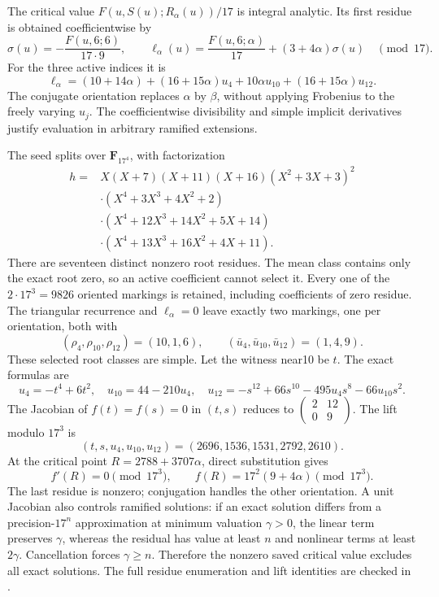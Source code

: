 \documentclass[
  british,
  10pt,
  a4paper,
]{article}
\begin{document}
The critical value \(F(u,S(u);R_\alpha(u))/17\) is integral analytic.
Its first residue is obtained coefficientwise by \[
\sigma(u)=-\frac{F(u,6;6)}{17\cdot9},
\qquad
\ell_\alpha(u)=\frac{F(u,6;\alpha)}{17}+(3+4\alpha)\sigma(u)
\quad\pmod{17}.
\] For the three active indices it is \[
\ell_\alpha=(10+14\alpha)+(16+15\alpha)u_4
 +10\alpha u_{10}+(16+15\alpha)u_{12}.
\] The conjugate orientation replaces \(\alpha\) by \(\beta\), without
applying Frobenius to the freely varying \(u_j\). The coefficientwise
divisibility and simple implicit derivatives justify evaluation in
arbitrary ramified extensions.

The seed splits over \(\mathbf F_{17^4}\), with factorization \[
\begin{aligned}
h={}&X(X+7)(X+11)(X+16)(X^2+3X+3)^2\\
 &\cdot(X^4+3X^3+4X^2+2)\\
 &\cdot(X^4+12X^3+14X^2+5X+14)\\
 &\cdot(X^4+13X^3+16X^2+4X+11).
\end{aligned}
\] There are seventeen distinct nonzero root residues. The mean class
contains only the exact root zero, so an active coefficient cannot
select it. Every one of the \(2\cdot17^3=9826\) oriented markings is
retained, including coefficients of zero residue. The triangular
recurrence and \(\ell_\alpha=0\) leave exactly two markings, one per
orientation, both with \[
(\rho_4,\rho_{10},\rho_{12})=(10,1,6),\qquad
(\bar u_4,\bar u_{10},\bar u_{12})=(1,4,9).
\] These selected root classes are simple. Let the witness near10 be
\(t\). The exact formulas are \[
 u_4=-t^4+6t^2,\quad u_{10}=44-210u_4,
\quad u_{12}=-s^{12}+66s^{10}-495u_4s^8-66u_{10}s^2.
\] The Jacobian of \(f(t)=f(s)=0\) in \((t,s)\) reduces to
\(\left(\begin{smallmatrix}2&12\\0&9\end{smallmatrix}\right)\). The lift
modulo \(17^3\) is \[
(t,s,u_4,u_{10},u_{12})=(2696,1536,1531,2792,2610).
\] At the critical point \(R=2788+3707\alpha\), direct substitution
gives \[
f'(R)=0\pmod{17^3},\qquad
f(R)=17^2(9+4\alpha)\pmod{17^3}.
\] The last residue is nonzero; conjugation handles the other
orientation. A unit Jacobian also controls ramified solutions: if an
exact solution differs from a precision-\(17^n\) approximation at
minimum valuation \(\gamma>0\), the linear term preserves \(\gamma\),
whereas the residual has value at least \(n\) and nonlinear terms at
least \(2\gamma\). Cancellation forces \(\gamma\ge n\). Therefore the
nonzero saved critical value excludes all exact solutions. The full
residue enumeration and lift identities are checked in
.
\end{document}
